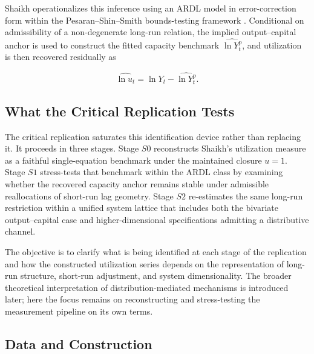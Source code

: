 \documentclass[11pt,a4paper]{article}
\begin{document}
Shaikh operationalizes this inference using an ARDL model in error-correction form
within the Pesaran--Shin--Smith bounds-testing framework \citep{Pesaran2001}. Conditional
on admissibility of a non-degenerate long-run relation, the implied output--capital
anchor is used to construct the fitted capacity benchmark \( \widehat{\ln Y_t^p} \),
and utilization is then recovered residually as

\begin{equation}
	\widehat{\ln u_t} = \ln Y_t - \widehat{\ln Y_t^p}.
\end{equation}

\subsection{What the Critical Replication Tests}

The critical replication saturates this identification device rather than replacing it.
It proceeds in three stages. Stage \( S0 \) reconstructs Shaikh's utilization measure
as a faithful single-equation benchmark under the maintained closure \( u = 1 \).
Stage \( S1 \) stress-tests that benchmark within the ARDL class by examining whether
the recovered capacity anchor remains stable under admissible reallocations of short-run
lag geometry. Stage \( S2 \) re-estimates the same long-run restriction within a unified
system lattice that includes both the bivariate output--capital case and
higher-dimensional specifications admitting a distributive channel.

The objective is to clarify what is being identified at each stage of the replication
and how the constructed utilization series depends on the representation of long-run
structure, short-run adjustment, and system dimensionality. The broader theoretical
interpretation of distribution-mediated mechanisms is introduced later; here the focus
remains on reconstructing and stress-testing the measurement pipeline on its own terms.


\subsection{Data and Construction}
\label{sec:ch3_data}
\end{document}
